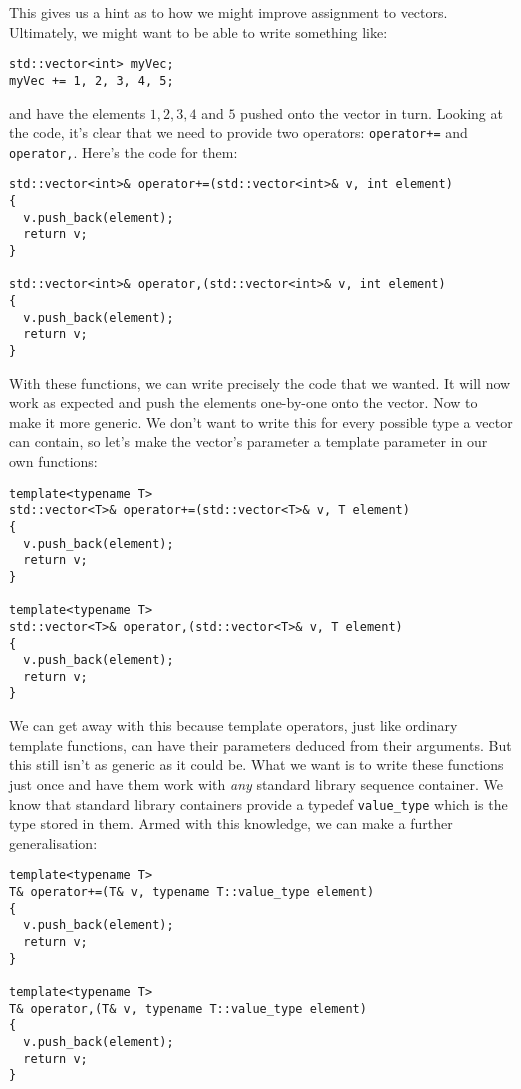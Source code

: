 \documentclass[a4paper]{scrartcl}
\begin{document}
This gives us a hint as to how we might improve assignment to vectors. Ultimately, we might want to be able to write something like:

\begin{verbatim}
std::vector<int> myVec;
myVec += 1, 2, 3, 4, 5;
\end{verbatim}

and have the elements $1, 2, 3, 4$ and $5$ pushed onto the vector in turn. Looking at the code, it's clear that we need to provide two operators: \verb|operator+=| and \verb|operator,|. Here's the code for them:

\begin{verbatim}
std::vector<int>& operator+=(std::vector<int>& v, int element)
{
  v.push_back(element);
  return v;
}

std::vector<int>& operator,(std::vector<int>& v, int element)
{
  v.push_back(element);
  return v;
}
\end{verbatim}

With these functions, we can write precisely the code that we wanted. It will now work as expected and push the elements one-by-one onto the vector. Now to make it more generic. We don't want to write this for every possible type a vector can contain, so let's make the vector's parameter a template parameter in our own functions:

\begin{verbatim}
template<typename T>
std::vector<T>& operator+=(std::vector<T>& v, T element)
{
  v.push_back(element);
  return v;
}

template<typename T>
std::vector<T>& operator,(std::vector<T>& v, T element)
{
  v.push_back(element);
  return v;
}
\end{verbatim}

We can get away with this because template operators, just like ordinary template functions, can have their parameters deduced from their arguments. But this still isn't as generic as it could be. What we want is to write these functions just once and have them work with \emph{any} standard library sequence container. We know that standard library containers provide a typedef \verb|value_type| which is the type stored in them. Armed with this knowledge, we can make a further generalisation:

\begin{verbatim}
template<typename T>
T& operator+=(T& v, typename T::value_type element)
{
  v.push_back(element);
  return v;
}

template<typename T>
T& operator,(T& v, typename T::value_type element)
{
  v.push_back(element);
  return v;
}
\end{verbatim}
\end{document}
